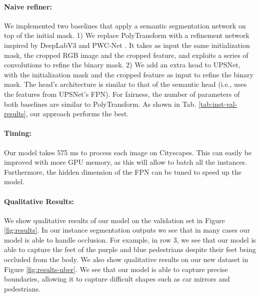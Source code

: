 \documentclass[10pt,twocolumn,letterpaper]{article}
\begin{document}
\vspace{-2mm}

\paragraph{Naive refiner:} We implemented two  baselines that apply a semantic segmentation network on top of the initial mask. 
1) We replace PolyTransform with a refinement network inspired by DeepLabV3 \cite{deeplabv3} and PWC-Net \cite{Sun2018PWC-Net} . 
It takes as input the same initialization mask, the cropped RGB image and the cropped feature, and exploits a series of convolutions to refine the binary mask. 
2) We add an extra head to  UPSNet, with the initialization mask and the cropped feature as input to refine the binary mask. The head's architecture  is similar to that of the semantic head (i.e., uses the features from  UPSNet's FPN).
For fairness, the number of parameters of both baselines are similar to PolyTransform. 
As shown in Tab. \ref{tab:inst-val-results}, our approach  performs the best.

\paragraph{Timing:}
Our model takes 575 ms to process each image on Cityscapes. This can easily be improved with more GPU memory, as this will allow to batch all the instances. Furthermore, the hidden dimension of the FPN can be tuned to speed up the model.

\vspace{-1mm}

\paragraph{Qualitative Results:}
We show qualitative results of our model on the validation set in Figure \ref{fig:results}. In our instance segmentation outputs we see that in many cases our model is able to handle occlusion. For example, in row 3, we see that our model is able to capture the feet of the purple and blue pedestrians despite their feet being occluded from the body. We also show qualitative results on our new dataset in Figure \ref{fig:results-uber}. We see that our model is able to capture precise boundaries, allowing it to capture difficult shapes such as car mirrors and pedestrians.
\end{document}
